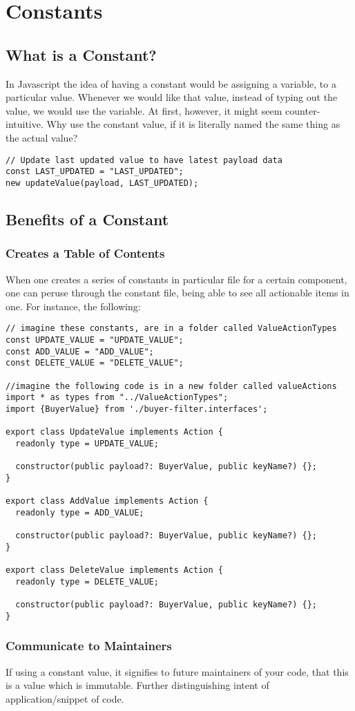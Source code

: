 \maketitle{}
\section{ Constants }

\subsection{ What is a Constant? }
In Javascript the idea of having a constant would be assigning a variable, to a
particular value. Whenever we would like that value, instead of typing out the
value, we would use the variable. At first, however, it might seem
counter-intuitive. Why use the constant value, if it is literally named the same
thing as the actual value?

\begin{lstlisting}[caption=Example of a Constant]
// Update last updated value to have latest payload data
const LAST_UPDATED = "LAST_UPDATED";
new updateValue(payload, LAST_UPDATED);
\end{lstlisting}

\subsection{ Benefits of a Constant }

\subsubsection { Creates a Table of Contents }
When one creates a series of constants in particular file for a certain
component, one can peruse through the constant file, being able to see all
actionable items in one. For instance, the following:
\begin{lstlisting}[caption=Example of a Constant]
// imagine these constants, are in a folder called ValueActionTypes
const UPDATE_VALUE = "UPDATE_VALUE";
const ADD_VALUE = "ADD_VALUE";
const DELETE_VALUE = "DELETE_VALUE";

//imagine the following code is in a new folder called valueActions
import * as types from "../ValueActionTypes";
import {BuyerValue} from './buyer-filter.interfaces';

export class UpdateValue implements Action {
  readonly type = UPDATE_VALUE;

  constructor(public payload?: BuyerValue, public keyName?) {};
}

export class AddValue implements Action {
  readonly type = ADD_VALUE;

  constructor(public payload?: BuyerValue, public keyName?) {};
}

export class DeleteValue implements Action {
  readonly type = DELETE_VALUE;

  constructor(public payload?: BuyerValue, public keyName?) {};
}
\end{lstlisting}

\subsubsection { Communicate to Maintainers }
If using a constant value, it signifies to future maintainers of your code, that
this is a value which is immutable. Further distinguishing intent of
application/snippet of code.
